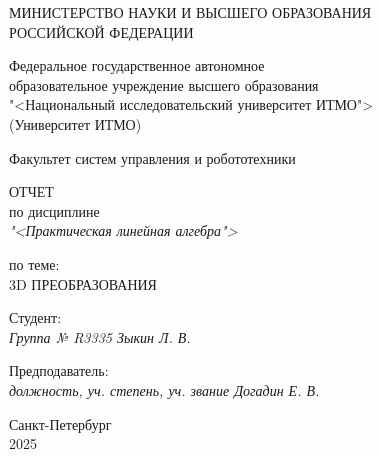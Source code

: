 \thispagestyle{empty}

\begin{center}
    МИНИСТЕРСТВО НАУКИ И ВЫСШЕГО ОБРАЗОВАНИЯ \\ РОССИЙСКОЙ ФЕДЕРАЦИИ

    \vspace{20pt}

    Федеральное государственное автономное \\ образовательное учреждение высшего образования \\
    "<Национальный исследовательский университет ИТМО"> \\
    (Университет ИТМО)

    \vspace{20pt}

    Факультет систем управления и робототехники
\end{center}

\vfill

\begin{center}
    ОТЧЕТ \\  
    по дисциплине \\
    \textit{"<Практическая линейная алгебра">}

    \vspace{20pt}

    по теме: \\
    \uppercase{3D преобразования}
\end{center}

\vfill

    \noindent Студент: \\
    \textit{Группа № R3335 \hfill Зыкин Л. В.}

    \vspace{20pt}

    \noindent Предподаватель: \\
    \textit{должность, уч. степень, уч. звание \hfill Догадин Е. В.}

\vfill

\begin{center}
    Санкт-Петербург \\ 2025
\end{center}